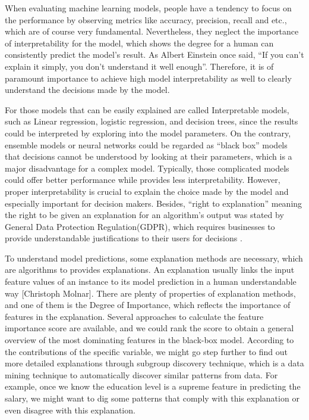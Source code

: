 \documentclass[runningheads]{llncs}
\begin{document}
	When evaluating machine learning models, people have a tendency to focus on the performance by observing metrics like accuracy, precision, recall and etc., which are of course very fundamental. Nevertheless, they neglect the importance of interpretability for the model, which shows the degree for a human can consistently predict the model’s result\cite{kim2016examples}. As Albert Einstein once said, “If you can’t explain it simply, you don’t understand it well enough”. Therefore, it is of paramount importance to achieve high model interpretability as well to clearly understand the decisions made by the model. 
	
	For those models that can be easily explained are called Interpretable models, such as Linear regression, logistic regression, and decision trees, since the results could be interpreted by exploring into the model parameters. On the contrary, ensemble models or neural networks could be regarded as “black box” models that decisions cannot be understood by looking at their parameters, which is a major disadvantage for a complex model. Typically, those complicated models could offer better performance while provides less interpretability. However, proper interpretability is crucial to explain the choice made by the model and especially important for decision makers. Besides, “right to explanation” meaning the right to be given an explanation for an algorithm’s output was stated by General Data Protection Regulation(GDPR), which requires businesses to provide understandable justifications to their users for decisions \cite{voigt2017eu}.
	
	To understand model predictions, some explanation methods are necessary, which are algorithms to provides explanations. An explanation usually links the input feature values of an instance to its model prediction in a human understandable way [Christoph Molnar]. There are plenty of properties of explanation methods, and one of them is the Degree of Importance, which reflects the importance of features in the explanation\cite{robnik2018perturbation}. Several approaches to calculate the feature importance score are available, and we could rank the score to obtain a general overview of the most dominating features in the black-box model. According to the contributions of the specific variable, we might go step further to find out more detailed explanations through subgroup discovery technique, which is a data mining technique to automatically discover similar patterns from data. For example, once we know the education level is a supreme feature in predicting the salary, we might want to dig some patterns that comply with this explanation or even disagree with this explanation.  
	
\end{document}
